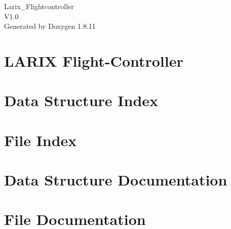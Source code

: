 \documentclass[twoside]{book}
\newcommand{\+}{\discretionary{\mbox{\scriptsize$\hookleftarrow$}}{}{}}
\newcommand{\clearemptydoublepage}{%
  \newpage{\pagestyle{empty}\cleardoublepage}%
}
\begin{document}
\hypersetup{pageanchor=false,
             bookmarksnumbered=true,
             pdfencoding=unicode
            }
\begin{titlepage}
\vspace*{7cm}
\begin{center}%
{\Large Larix\+\_\+\+Flightcontroller \\[1ex]\large V1.\+0 }\\
\vspace*{1cm}
{\large Generated by Doxygen 1.8.11}\\
\end{center}
\end{titlepage}
\clearemptydoublepage
\tableofcontents
\clearemptydoublepage
{}
\hypersetup{pageanchor=true}

\chapter{L\+A\+R\+IX Flight-\/\+Controller}
\label{index}\hypertarget{index}{}
\chapter{Data Structure Index}

\chapter{File Index}

\chapter{Data Structure Documentation}








\chapter{File Documentation}






























\backmatter
\newpage
{}
\clearemptydoublepage
{}
\printindex
\end{document}

